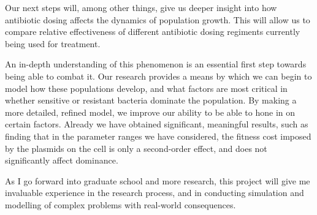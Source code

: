 \documentclass[numbib]{buthesis_p}  %
\begin{document}
Our next steps will, among other things, %
give us deeper insight into how antibiotic dosing affects the dynamics of
population growth. This will allow us to compare relative effectiveness of
different antibiotic dosing regiments currently being used for treatment.

An in-depth understanding of this phenomenon is an essential first step towards
being able to combat it. Our research provides a means by which we can begin
to model how these populations develop, and what factors are most critical
in whether sensitive or resistant bacteria dominate the population. By
making a more detailed, refined model, we improve our ability to be able
to hone in on certain factors. Already we have obtained significant,
meaningful results, such as finding that in the parameter ranges we
have considered, the fitness cost imposed
by the plasmids on the cell is only a second-order effect, and does not significantly
affect dominance.

As I go forward into graduate school and more research, this project will give me
invaluable experience in the research process, and in conducting simulation and
modelling of complex problems with real-world consequences.

%
\end{document}
